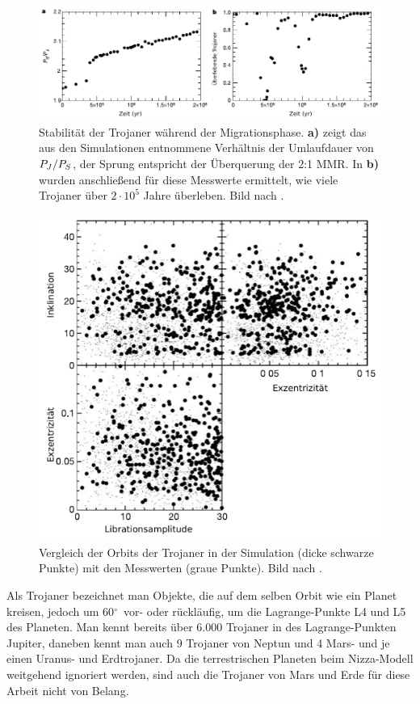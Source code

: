 \documentclass[12pt,a4paper,twoside]{article}
\renewcommand{\cite}{\citep}
\newcommand{\degree}{$^\circ$}
\begin{document}
\begin{figure}
\centering 
\includegraphics[scale=1]{img/Morbidelli2005-1v}
\caption{Stabilität der Trojaner während der Migrationsphase. \textbf{a)} zeigt das aus den Simulationen entnommene Verhältnis der Umlaufdauer von $P_J/P_S$, der Sprung entspricht der Überquerung der 2:1 MMR. In \textbf{b)} wurden anschließend für diese Messwerte ermittelt, wie viele Trojaner über $2\cdot10^5$ Jahre überleben. Bild nach \cite{Morbidelli2005}.}
\label{fig:Trojanerstabilitaet}
\end{figure}
\begin{figure}
\centering 
\includegraphics[scale=1]{img/Morbidelli2005-2}
\caption{Vergleich der Orbits der Trojaner in der Simulation (dicke schwarze Punkte) mit den Messwerten (graue Punkte). Bild nach \cite{Morbidelli2005}.}
\label{fig:Trojanerorbitale}
\end{figure}
Als Trojaner bezeichnet man Objekte, die auf dem selben Orbit wie ein Planet kreisen, jedoch um 60\degree\ vor- oder rückläufig, um die Lagrange-Punkte L4 und L5 des Planeten. 
Man kennt bereits über 6.000 Trojaner in des Lagrange-Punkten Jupiter, daneben kennt man auch 9 Trojaner von Neptun und 4 Mars- und je einen Uranus- und Erdtrojaner\cite{IAU14}.
Da die terrestrischen Planeten beim Nizza-Modell weitgehend ignoriert werden, sind auch die Trojaner von Mars und Erde für diese Arbeit nicht von Belang.
\end{document}
